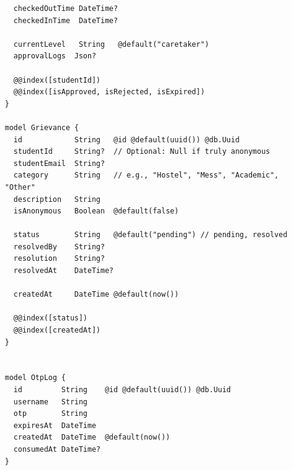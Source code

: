 \documentclass[11pt,a4paper,oneside]{article}
\begin{document}
\begin{lstlisting}
  checkedOutTime DateTime?
  checkedInTime  DateTime?
  
  currentLevel   String   @default("caretaker")
  approvalLogs  Json?

  @@index([studentId])
  @@index([isApproved, isRejected, isExpired])
}

model Grievance {
  id            String   @id @default(uuid()) @db.Uuid
  studentId     String?  // Optional: Null if truly anonymous
  studentEmail  String?
  category      String   // e.g., "Hostel", "Mess", "Academic", "Other"
  description   String
  isAnonymous   Boolean  @default(false)
  
  status        String   @default("pending") // pending, resolved
  resolvedBy    String?
  resolution    String?
  resolvedAt    DateTime?
  
  createdAt     DateTime @default(now())

  @@index([status])
  @@index([createdAt])
}


model OtpLog {
  id         String    @id @default(uuid()) @db.Uuid
  username   String
  otp        String
  expiresAt  DateTime
  createdAt  DateTime  @default(now())
  consumedAt DateTime?
}

\end{lstlisting}
\end{document}
